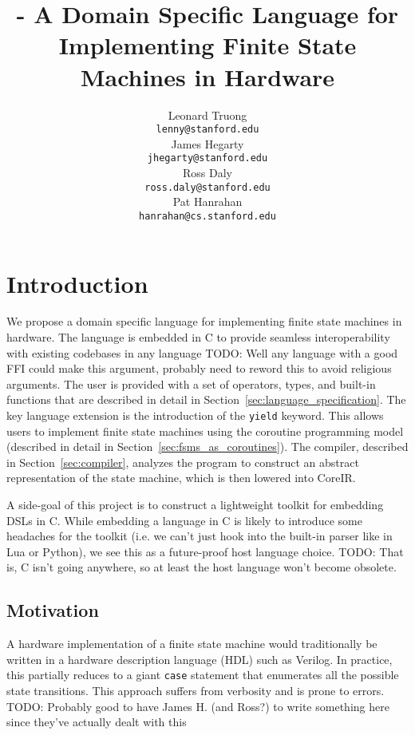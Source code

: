 \documentclass{article}
\title{\NAME - A Domain Specific Language for Implementing Finite State Machines in Hardware}
\author{
  Leonard Truong\\%
  \texttt{lenny@stanford.edu} \\
  \And
  James Hegarty \\
  \texttt{jhegarty@stanford.edu} \\
  \AND
  Ross Daly \\
  \texttt{ross.daly@stanford.edu} \\
  \And
  Pat Hanrahan \\
  \texttt{hanrahan@cs.stanford.edu} \\
}
\newcommand{\TODO}[1]{}
\renewcommand{\TODO}[1]{{\color{red} TODO: {#1}}}
\begin{document}

\maketitle

\begin{abstract}
\end{abstract}

\section{Introduction}
We propose a domain specific language for implementing finite state
machines in hardware. The language is embedded in C to provide seamless
interoperability with existing codebases in any language \TODO{Well any
language with a good FFI could make this argument, probably need to
reword this to avoid religious arguments}. The user is provided with a
set of operators, types, and built-in functions that are described in
detail in Section~\ref{sec:language_specification}. The key language
extension is the introduction of the \texttt{yield} keyword. This
allows users to implement finite state machines using the coroutine programming
model (described in detail in Section~\ref{sec:fsms_as_coroutines}). The
compiler, described in Section~\ref{sec:compiler}, analyzes the program to
construct an abstract representation of the state machine, which is then
lowered into CoreIR.

A side-goal of this project is to construct a lightweight toolkit for
embedding DSLs in C. While embedding a language in C is likely to
introduce some headaches for the toolkit (i.e. we can't just hook into
the built-in parser like in Lua or Python), we see this as a
future-proof host language choice. \TODO{That is, C isn't going
anywhere, so at least the host language won't become obsolete.}

\subsection{Motivation}
A hardware implementation of a finite state machine would traditionally
be written in a hardware description language (HDL) such as Verilog. In
practice, this partially reduces to a giant \texttt{case} statement
that enumerates all the possible state transitions. This approach
suffers from verbosity and is prone to errors. \TODO{Probably good to have James H. (and Ross?) to write something here since they've actually dealt with this}
\end{document}
